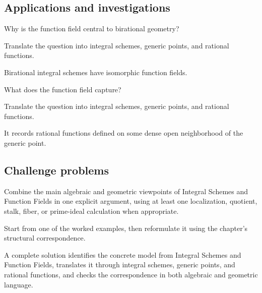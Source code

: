 \subsection*{Applications and investigations}

\begin{exercise}\label{exr:vi27-expand-13}
Why is the function field central to birational geometry?
\end{exercise}
\begin{hint}
Translate the question into integral schemes, generic points, and rational functions.
\end{hint}
\begin{solution}
Birational integral schemes have isomorphic function fields.
\end{solution}

\begin{exercise}\label{exr:vi27-expand-14}
What does the function field capture?
\end{exercise}
\begin{hint}
Translate the question into integral schemes, generic points, and rational functions.
\end{hint}
\begin{solution}
It records rational functions defined on some dense open neighborhood of the generic point.
\end{solution}

\subsection*{Challenge problems}

\begin{exercise}\label{exr:vi27-expand-15}
Combine the main algebraic and geometric viewpoints of Integral Schemes and Function Fields in one explicit argument, using at least one localization, quotient, stalk, fiber, or prime-ideal calculation when appropriate.
\end{exercise}
\begin{hint}
Start from one of the worked examples, then reformulate it using the chapter's structural correspondence.
\end{hint}
\begin{solution}
A complete solution identifies the concrete model from Integral Schemes and Function Fields, translates it through integral schemes, generic points, and rational functions, and checks the correspondence in both algebraic and geometric language.
\end{solution}

